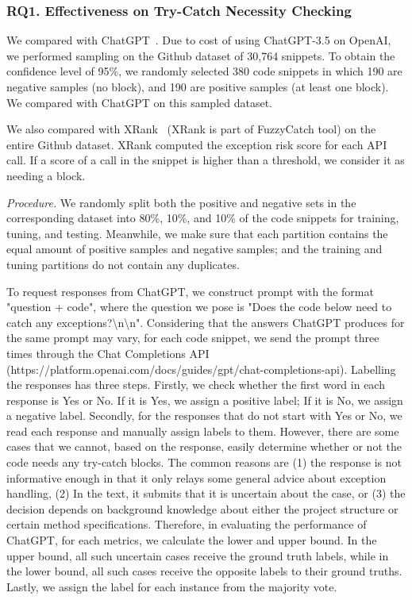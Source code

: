 \subsubsection{RQ1. Effectiveness on Try-Catch Necessity Checking}

 We compared {\xblock} with
ChatGPT~\cite{tien}. Due to cost of using ChatGPT-3.5 on OpenAI, we performed
sampling on the Github dataset of 30,764 snippets. To obtain the
confidence level of 95\%, we randomly selected 380 code snippets in
which 190 are negative samples (no  block), and 190
are positive samples (at least one  block). We
compared with ChatGPT on this sampled dataset. 

We also compared {\xblock} with XRank~\cite{xrank-fse20} (XRank is
part of FuzzyCatch tool) on the entire Github dataset. XRank computed
the exception risk score for each API call. If a score of a call in
the snippet is higher than a threshold, we consider it as needing a
 block.

{\em Procedure.} We randomly split both the positive and negative sets
in the corresponding dataset into 80\%, 10\%, and 10\% of the code
snippets for training, tuning, and testing. Meanwhile, we make sure
that each partition contains the equal amount of positive samples and
negative samples; and the training and tuning partitions do not
contain any duplicates. 

To request responses from ChatGPT, we construct prompt with the format "question + code", where the question we pose is "Does the code below need to catch any exceptions?\textbackslash n\textbackslash n". 
Considering that the answers ChatGPT produces for the same prompt may vary, for each code snippet, we send the prompt three times through the Chat Completions API
(https://platform.openai.com/docs/guides/gpt/chat-completions-api). Labelling the responses has three steps. Firstly, we check whether the first word in 
each response is Yes or No. If it is Yes, we assign a positive label; If it is No, we assign a negative label. Secondly, for the responses that do not start with Yes or No, we read each response and manually assign labels to them. 
However, there are some cases that we cannot, based on the response, easily determine whether or not the code needs any try-catch blocks. The common reasons are (1) the response is not informative enough in that it only relays some general advice about exception handling,
(2) In the text, it submits that it is uncertain about the case, or (3) the decision depends on background knowledge about either the project structure or certain method specifications. 
Therefore, in evaluating the performance of ChatGPT, for each metrics, we calculate the lower and upper bound. In the upper bound, all such uncertain cases receive the ground truth labels, while in the lower bound, all such cases receive the opposite labels to their ground truths. Lastly, we assign the label for each instance from the majority vote.

